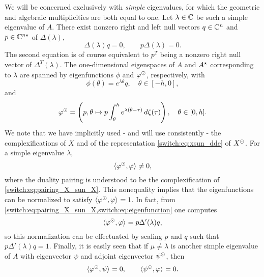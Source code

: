 We will be concerned exclusively with \emph{simple} eigenvalues, for which the geometric and algebraic multiplicities are both equal to one. Let $\lambda \in \mathbb{C}$ be such a simple eigenvalue of $A$. There exist nonzero right and left null vectors  $q \in \mathbb{C}^n$ and $p \in \mathbb{C}^{n\star}$ of $\Delta(\lambda)$,
%
\[
  \Delta(\lambda)q = 0, \qquad p\Delta(\lambda) = 0.
\]
%
The second equation is of course equivalent to $p^T$ being a nonzero right null vector of $\Delta^T(\lambda)$. The one-dimensional eigenspaces of $A$ and $A^{\star}$ corresponding to $\lambda$ are spanned by eigenfunctions $\phi$ and $\varphi^{\odot}$, respectively, with
%
\begin{equation}
  \label{switch:eq:eigenfunction}
  \phi(\theta) = e^{\lambda\theta}q, \quad \theta \in [-h,0],
\end{equation}
and
\begin{equation}
  \label{switch:eq:eigenfunction1}
  \varphi^{\odot} = \left(p, \theta \mapsto p\int_{\theta}^{h}e^{\lambda(\theta-\tau)}\,d\zeta(\tau)\right), \quad \theta \in [0,h].
\end{equation}
%
We note that we have implicitly used - and will use consistently - the complexifications of $X$ and of the representation \cref{switch:eq:xsun_dde} of $X^{\odot}$. For a simple eigenvalue $\lambda$,
%
\[
  \langle \varphi^{\odot},\varphi \rangle_{} \neq 0,
\]
%
where the duality pairing is understood to be the complexification of \cref{switch:eq:pairing_X_sun_X}. This nonequality implies that the eigenfunctions can be normalized to satisfy $\langle \varphi^{\odot},\varphi \rangle_{} = 1$. In fact, from \cref{switch:eq:pairing_X_sun_X,switch:eq:eigenfunction} one computes
%
\begin{equation}
  \label{switch:eq:normpair}
  \langle \varphi^{\odot},\varphi \rangle_{} = p\Delta'(\lambda)q,
\end{equation}
%
so this normalization can be effectuated by scaling $p$ and $q$ such that $p\Delta'(\lambda)q = 1$. Finally, it is easily seen that if $\mu \neq \lambda$ is another simple eigenvalue of $A$ with eigenvector $\psi$ and adjoint eigenvector $\psi^{\odot}$, then
\begin{equation}
  \label{switch:eq:zeropair}
  \langle \varphi^{\odot},\psi \rangle_{} = 0, \qquad \langle \psi^{\odot},\varphi \rangle_{} = 0.
\end{equation}

